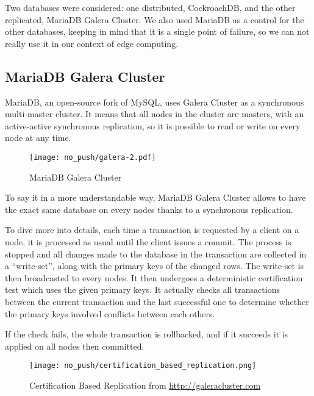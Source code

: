Two databases were considered: one distributed, CockroachDB, and the other replicated, MariaDB Galera Cluster. We also used MariaDB as a control for the other databases, keeping in mind that it is a single point of failure, so we can not really use it in our context of edge computing.

\subsection{MariaDB Galera Cluster}

MariaDB, an open-source fork of MySQL, uses Galera Cluster as a synchronous multi-master cluster. It means that all nodes in the cluster are masters, with an active-active synchronous replication, so it is possible to read or write on every node at any time.

\begin{figure}[H]
  \vspace{-10pt}
  \centering
  \centerline{\texttt{[image: no\_push/galera-2.pdf]}}
  \vspace{-5pt}
  \caption{MariaDB Galera Cluster}
  \vspace{-5pt}
  \label{fig:MGC}
\end{figure}

To say it in a more understandable way, MariaDB Galera Cluster allows to have the exact same database on every nodes thanks to a synchronous replication.

To dive more into details, each time a transaction is requested by a client on a node, it is processed as usual until the client issues a commit. The process is stopped and all changes made to the database in the transaction are collected in a ``write-set'', along with the primary keys of the changed rows. The write-set is then broadcasted to every nodes. It then undergoes a deterministic certification test which uses the given primary keys. It actually checks all transactions between the current transaction and the last successful one to determine whether the primary keys involved conflicts between each others.

If the check fails, the whole transaction is rollbacked, and if it succeeds it is applied on all nodes then committed.

\begin{figure}[H]
  \vspace{-10pt}
  \centering
  \centerline{\texttt{[image: no\_push/certification\_based\_replication.png]}}
  \vspace{-5pt}
  \caption{Certification Based Replication from \url{http://galeracluster.com} }
  \vspace{-5pt}
  \label{fig:certificationcommit}
\end{figure}


